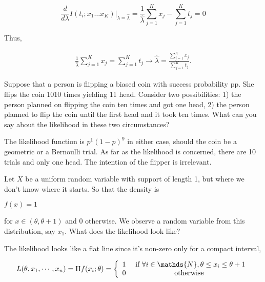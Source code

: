 \documentclass{homework}
\begin{document}
\begin{dmath*}
\frac{d}{d\lambda} I(t_i; x_1\ldots x_K)\bigg|_{\lambda=\hat{\lambda}} = \frac{1}{\hat{\lambda}} \sum_{j=1}^{K} x_j -  \sum_{j=1}^{K}t_j = 0
\end{dmath*}

Thus, 

\begin{align*}
\frac{1}{\hat{\lambda}} \sum_{j=1}^{K} x_j = \sum_{j=1}^{K}t_j \longrightarrow \hat{\lambda}=\frac{\sum_{j=1}^{K} x_j}{\sum_{j=1}^{K}t_j}. 
\end{align*}

\begin{tcolorbox}[title=Question 5]
Suppose that a person is flipping  a biased coin with success probability pp. She flips the coin 1010 times yielding 11 head. Consider two possibilities: 1) the person planned on flipping the coin ten times and got one head, 2) the person planned to flip the coin until the first head and it took ten times. What can you say about the likelihood in these two circumstances?
\end{tcolorbox}

The likelihood function is $p^1(1-p)^9$ in either case, should the coin be a geometric or a Bernoulli trial. As far as the likelihood is concerned, there are 10 trials and only one head. The intention of the flipper is irrelevant. \\

\begin{tcolorbox}[title=Question 6]
Let $X$ be a uniform random variable with support of length 1, but where we don't know where it starts. So that the density is

$ f(x) = 1$  

for $x \in (\theta, \theta + 1)$ and $0$ otherwise. We observe a random variable from this distribution, say $x_1$. What does the likelihood look like?
\end{tcolorbox}

The likelihood looks like a flat line since it's non-zero only for a compact interval, 

\begin{equation*}
    L(\theta,x_1,\cdots, x_n) = \Pi f(x_i; \theta) = \left\{ \begin{array}{lcc}
             1 &  \textnormal{ if } \forall i\in \mathds{N}, \theta \leq x_i \leq \theta+1  \\
             0 &  \textnormal{ otherwise } 
             \end{array}
   \right.
\end{equation*}
\end{document}
